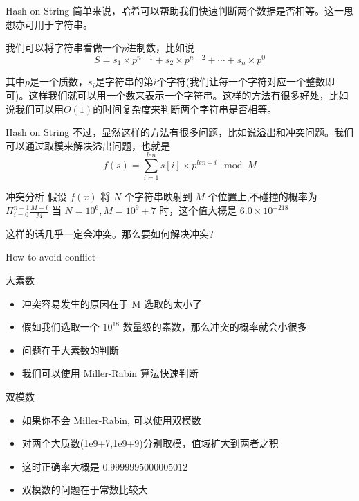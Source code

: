 \documentclass{ldr-simple-gray}
\begin{document}
  \begin{frame}{Hash on String}
    简单来说，哈希可以帮助我们快速判断两个数据是否相等。这一思想亦可用于字符串。\newline

    我们可以将字符串看做一个$p$进制数，比如说
    $$S = s_1 \times p^{n-1} + s_2 \times p^{n-2} + \cdots + s_n \times p^0$$

    其中$p$是一个质数，$s_i$是字符串的第$i$个字符(我们让每一个字符对应一个整数即可)。这样我们就可以用一个数来表示一个字符串。这样的方法有很多好处，比如说我们可以用$O(1)$的时间复杂度来判断两个字符串是否相等。
  \end{frame}

  \begin{frame}{Hash on String}
    不过，显然这样的方法有很多问题，比如说溢出和冲突问题。我们可以通过取模来解决溢出问题，也就是
    $$f(s)=\sum_{i=1}^{len}{s[i]\times{p^{len-i}}}\mod M$$

    \begin{block}{冲突分析}
      假设 $f(x)$ 将 $N$ 个字符串映射到 $M$ 个位置上,不碰撞的概率为 $\Pi_{i=0}^{n-1}{\frac{M-i}{M}}$\newline
      当 $N=10^6,M=10^9+7$ 时，这个值大概是 $6.0\times10^{-218}$
    \end{block}
  
    这样的话几乎一定会冲突。那么要如何解决冲突?
  \end{frame}

  \begin{frame}{How to avoid conflict}
    \begin{block}{大素数}
      \begin{itemize}
        \item 冲突容易发生的原因在于 M 选取的太小了
        \item 假如我们选取一个 $10^{18}$ 数量级的素数，那么冲突的概率就会小很多
        \item 问题在于大素数的判断
        \item 我们可以使用 Miller-Rabin 算法快速判断
      \end{itemize}
    \end{block}
  
    \begin{block}{双模数}
      \begin{itemize}
        \item 如果你不会 Miller-Rabin, 可以使用双模数
        \item 对两个大质数(1e9+7,1e9+9)分别取模，值域扩大到两者之积
        \item 这时正确率大概是 $0.9999995000005012$
        \item 双模数的问题在于常数比较大
      \end{itemize}
    \end{block}
  \end{frame}
  
\end{document}
